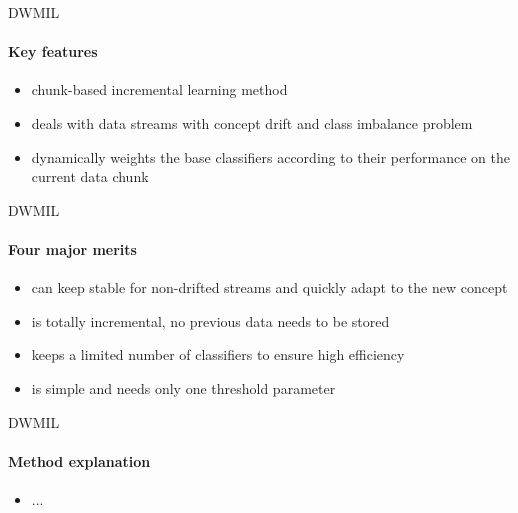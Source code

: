 
\begin{frame}{DWMIL}
\framesubtitle{Key features}

\begin{itemize}
    \item chunk-based incremental learning method
    \item deals with data streams with concept drift and class imbalance problem
    \item dynamically weights the base classifiers according to their performance on the current data chunk
\end{itemize}

\end{frame}


\begin{frame}{DWMIL}
\framesubtitle{Four major merits}

\begin{itemize}
    \item can keep stable for non-drifted streams and quickly adapt to the new concept
    \item is totally incremental, no previous data needs to be stored
    \item keeps a limited number of classifiers to ensure high efficiency
    \item is simple and needs only one threshold parameter
\end{itemize}

\end{frame}


\begin{frame}{DWMIL}
\framesubtitle{Method explanation}

\begin{itemize}
    \item ...
\end{itemize}

\end{frame}

